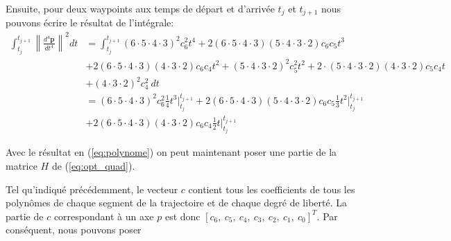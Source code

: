 \documentclass{article}
\newcommand{\norm}[1]{\left\lVert#1\right\rVert}
\begin{document}
Ensuite, pour deux waypoints aux temps de départ et d'arrivée $t_j$ et $t_{j+1}$ nous pouvons écrire le résultat de l'intégrale:
\begin{align}
\int_{t_j}^{t_{j+1}} \norm{\frac{d^4 \boldsymbol{p}}{dt^4}}^2 dt
	& = \int_{t_j}^{t_{j+1}} (6\cdot 5\cdot 4\cdot 3)^2 c_6^2 t^4 + 2(6\cdot 5\cdot 4\cdot 3)(5 \cdot 4\cdot 3\cdot 2) c_6 c_5 t^3 \\
	&	+ 2(6 \cdot 5 \cdot 4\cdot 3)(4\cdot 3\cdot 2)c_6 c_4 t^2 + (5 \cdot 4\cdot 3\cdot 2)^2 c_5^2 t^2 + 2 \cdot (5 \cdot 4\cdot 3\cdot 2)(4\cdot 3\cdot 2)c_5 c_4 t \nonumber \\
	&	+ (4\cdot 3\cdot 2)^2 c_4^2 \ dt\nonumber \\
	&= (6\cdot 5\cdot 4\cdot 3)^2 c_6^2 \frac{1}{4} t^3 \Big|_{t_j}^{t_{j+1}} + 2(6\cdot 5\cdot 4\cdot 3)(5 \cdot 4\cdot 3\cdot 2) c_6 c_5 \frac{1}{3} t^2\Big|_{t_j}^{t_{j+1}}\nonumber \\
	&	 + 2(6\cdot 5\cdot 4\cdot 3)(4\cdot 3\cdot 2) c_6 c_4 \frac{1}{2} t\Big|_{t_j}^{t_{j+1}}
\end{align}


Avec le résultat en (\ref{eq:polynome}) on peut maintenant poser une partie de la matrice $H$ de (\ref{eq:opt_quad}).

Tel qu'indiqué précédemment, le vecteur $c$ contient tous les coefficients de tous les polynômes de chaque segment de la trajectoire et de chaque degré de liberté. La partie de $c$ correspondant à un axe $p$ est donc $[c_6,\ c_5,\ c_4,\ c_3,\ c_2,\ c_1,\ c_0]^T$. Par conséquent, nous pouvons poser 
\end{document}
